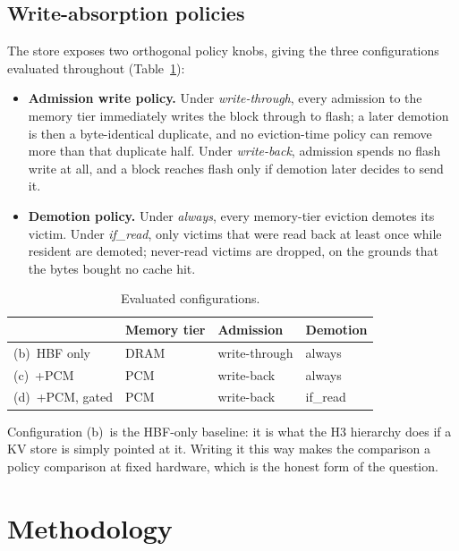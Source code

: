 \documentclass[conference]{IEEEtran}
\newcommand{\cfgb}{\textsf{(b)}}
\newcommand{\cfgc}{\textsf{(c)}}
\newcommand{\cfgd}{\textsf{(d)}}
\begin{document}
\subsection{Write-absorption policies}
The store exposes two orthogonal policy knobs, giving the three configurations
evaluated throughout (Table~\ref{tab:configs}):

\begin{itemize}
  \item \textbf{Admission write policy.} Under \emph{write-through}, every
        admission to the memory tier immediately writes the block through to
        flash; a later demotion is then a byte-identical duplicate, and no
        eviction-time policy can remove more than that duplicate half. Under
        \emph{write-back}, admission spends no flash write at all, and a block
        reaches flash only if demotion later decides to send it.
  \item \textbf{Demotion policy.} Under \emph{always}, every memory-tier
        eviction demotes its victim. Under \emph{if\_read}, only victims that
        were read back at least once while resident are demoted; never-read
        victims are dropped, on the grounds that the bytes bought no cache hit.
\end{itemize}

\begin{table}[t]
\centering
\caption{Evaluated configurations.}
\label{tab:configs}
\small
\begin{tabular}{llll}
\toprule
 & \textbf{Memory tier} & \textbf{Admission} & \textbf{Demotion} \\
\midrule
\cfgb\ HBF only      & DRAM & write-through & always \\
\cfgc\ +PCM          & PCM  & write-back    & always \\
\cfgd\ +PCM, gated   & PCM  & write-back    & if\_read \\
\bottomrule
\end{tabular}
\end{table}

Configuration \cfgb\ is the HBF-only baseline: it is what the H3 hierarchy does
if a KV store is simply pointed at it. Writing it this way makes the comparison
a policy comparison at fixed hardware, which is the honest form of the question.

\section{Methodology}\label{sec:method}
\end{document}
